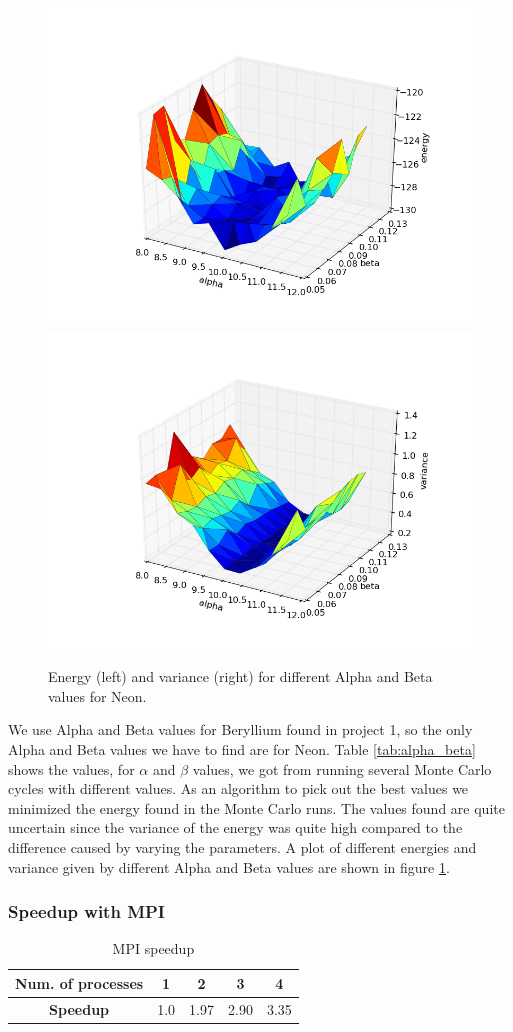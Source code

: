 \documentclass[11pt]{article}
\begin{document}
			\begin{figure}
				\centering \includegraphics[width=0.45\linewidth]{../figures/Neon_alpha_beta}
				\centering \includegraphics[width=0.45\linewidth]{../figures/Neon_alpha_beta_var}
				\protect\caption{Energy (left) and variance (right) for different Alpha and Beta values for Neon.}
				\label{fig:alpha_beta_comparison}
			\end{figure}

			We use Alpha and Beta values for Beryllium found in project 1, so the only Alpha and Beta values we have to find are for Neon. Table \ref{tab:alpha_beta} shows the values, for \(\alpha\) and \(\beta\) values, we got from  running several Monte Carlo cycles with different values. As an algorithm to pick out the best values we minimized the energy found in the Monte Carlo runs. The values found are quite uncertain since the variance of the energy was quite high compared to the difference caused by varying the parameters. A plot of different energies and variance given by different Alpha and Beta values are shown in figure \ref{fig:alpha_beta_comparison}.

		\subsubsection{Speedup with MPI}
			\begin{table}
			\center
					\begin{tabular}{| c | c| c| c| c|}
					    \hline
					   	\textbf{Num. of processes} &	1	&	2	&	3	&	4
					    \\ \hline
					    \textbf{Speedup}	&	1.0	&	1.97	&	2.90	&	3.35
					    \\	\hline
				  \end{tabular}
				  \caption{MPI speedup}
				  \label{tab:MPI_speedup}
			\end{table}
\end{document}
